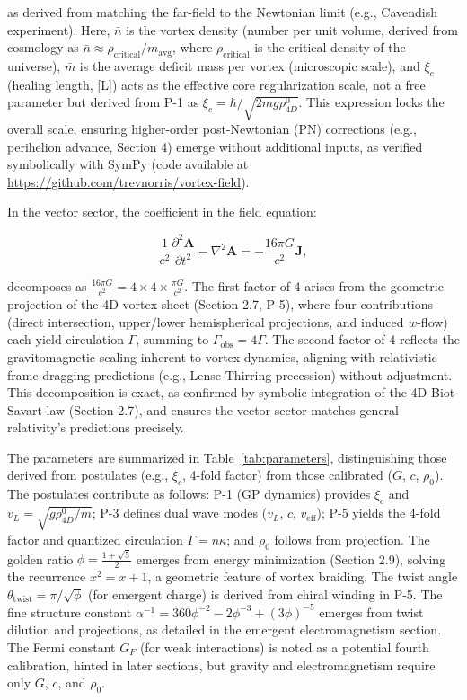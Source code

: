 
as derived from matching the far-field to the Newtonian limit (e.g., Cavendish experiment). Here, $\bar{n}$ is the vortex density (number per unit volume, derived from cosmology as $\bar{n} \approx \rho_{\text{critical}} / m_{\text{avg}}$, where $\rho_{\text{critical}}$ is the critical density of the universe), $\bar{m}$ is the average deficit mass per vortex (microscopic scale), and $\xi_c$ (healing length, [L]) acts as the effective core regularization scale, not a free parameter but derived from P-1 as $\xi_c = \hbar / \sqrt{2 m g \rho_{4D}^0}$. This expression locks the overall scale, ensuring higher-order post-Newtonian (PN) corrections (e.g., perihelion advance, Section 4) emerge without additional inputs, as verified symbolically with SymPy (code available at \url{https://github.com/trevnorris/vortex-field}).

In the vector sector, the coefficient in the field equation:

\[
\frac{1}{c^2} \frac{\partial^2 \mathbf{A}}{\partial t^2} - \nabla^2 \mathbf{A} = -\frac{16\pi G}{c^2} \mathbf{J},
\]

decomposes as $\frac{16\pi G}{c^2} = 4 \times 4 \times \frac{\pi G}{c^2}$. The first factor of 4 arises from the geometric projection of the 4D vortex sheet (Section 2.7, P-5), where four contributions (direct intersection, upper/lower hemispherical projections, and induced $w$-flow) each yield circulation $\Gamma$, summing to $\Gamma_{\text{obs}} = 4\Gamma$. The second factor of 4 reflects the gravitomagnetic scaling inherent to vortex dynamics, aligning with relativistic frame-dragging predictions (e.g., Lense-Thirring precession) without adjustment. This decomposition is exact, as confirmed by symbolic integration of the 4D Biot-Savart law (Section 2.7), and ensures the vector sector matches general relativity's predictions precisely.


The parameters are summarized in Table~\ref{tab:parameters}, distinguishing those derived from postulates (e.g., $\xi_c$, 4-fold factor) from those calibrated ($G$, $c$, $\rho_0$). The postulates contribute as follows: P-1 (GP dynamics) provides $\xi_c$ and $v_L = \sqrt{g \rho_{4D}^0 / m}$; P-3 defines dual wave modes ($v_L$, $c$, $v_{\text{eff}}$); P-5 yields the 4-fold factor and quantized circulation $\Gamma = n \kappa$; and $\rho_0$ follows from projection. The golden ratio $\phi = \frac{1 + \sqrt{5}}{2}$ emerges from energy minimization (Section 2.9), solving the recurrence $x^2 = x + 1$, a geometric feature of vortex braiding. The twist angle $\theta_{\text{twist}} = \pi / \sqrt{\phi}$ (for emergent charge) is derived from chiral winding in P-5. The fine structure constant $\alpha^{-1} = 360 \phi^{-2} - 2 \phi^{-3} + (3 \phi)^{-5}$ emerges from twist dilution and projections, as detailed in the emergent electromagnetism section. The Fermi constant $G_F$ (for weak interactions) is noted as a potential fourth calibration, hinted in later sections, but gravity and electromagnetism require only $G$, $c$, and $\rho_0$.

